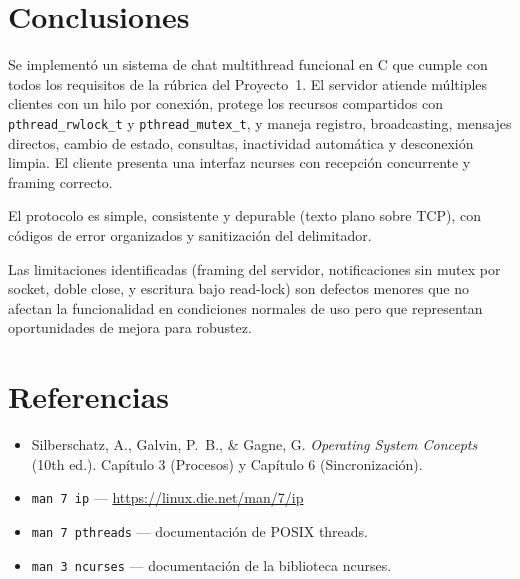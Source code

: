 \documentclass[12pt,a4paper]{article}
\begin{document}
\section{Conclusiones}

Se implementó un sistema de chat multithread funcional en C que cumple con todos los
requisitos de la rúbrica del Proyecto~1.  El servidor atiende múltiples clientes con
un hilo por conexión, protege los recursos compartidos con \texttt{pthread\_rwlock\_t}
y \texttt{pthread\_mutex\_t}, y maneja registro, broadcasting, mensajes directos,
cambio de estado, consultas, inactividad automática y desconexión limpia.  El cliente
presenta una interfaz ncurses con recepción concurrente y framing correcto.

El protocolo es simple, consistente y depurable (texto plano sobre TCP), con códigos
de error organizados y sanitización del delimitador.

Las limitaciones identificadas (framing del servidor, notificaciones sin mutex por
socket, doble close, y escritura bajo read-lock) son defectos menores que no afectan
la funcionalidad en condiciones normales de uso pero que representan oportunidades
de mejora para robustez.

\section*{Referencias}
\begin{itemize}[nosep]
    \item Silberschatz, A., Galvin, P.~B., \& Gagne, G. \textit{Operating System
          Concepts} (10th ed.). Capítulo 3 (Procesos) y Capítulo 6
          (Sincronización).
    \item \texttt{man 7 ip} --- \url{https://linux.die.net/man/7/ip}
    \item \texttt{man 7 pthreads} --- documentación de POSIX threads.
    \item \texttt{man 3 ncurses} --- documentación de la biblioteca ncurses.
\end{itemize}
\end{document}
